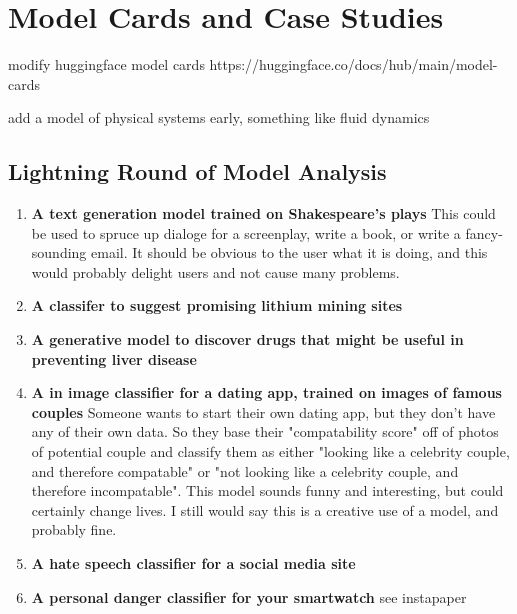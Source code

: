 \setchapterpreamble[u]{\margintoc}
\chapter{Model Cards and Case Studies}


modify huggingface model cards https://huggingface.co/docs/hub/main/model-cards

add a model of physical systems early, something like fluid dynamics

\section{Lightning Round of Model Analysis}

\begin{enumerate}
    \item \textbf{A text generation model trained on Shakespeare's plays} This could be used to spruce up dialoge for a screenplay, write a book, or write a fancy-sounding email. It should be obvious to the user what it is doing, and this would probably delight users and not cause many problems.
    \item \textbf{A classifer to suggest promising lithium mining sites}
    \item \textbf{A generative model to discover drugs that might be useful in preventing liver disease}
    \item \textbf{A in image classifier for a dating app, trained on images of famous couples} Someone wants to start their own dating app, but they don't have any of their own data. So they base their "compatability score" off of photos of potential couple and classify them as either "looking like a celebrity couple, and therefore compatable" or "not looking like a celebrity couple, and therefore incompatable". This model sounds funny and interesting, but could certainly change lives. I still would say this is a creative use of a model, and probably fine.
    \item \textbf{A hate speech classifier for a social media site}
    \item \textbf{A personal danger classifier for your smartwatch} see instapaper


\end{enumerate}
